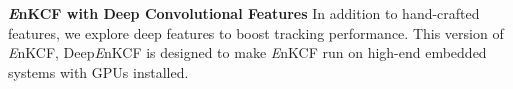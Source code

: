 \documentclass[10pt,twocolumn,letterpaper]{article}
\begin{document}
\textbf{{\it E}nKCF with Deep Convolutional Features} In addition to
hand-crafted features, we explore deep features to boost tracking
performance. This version of {\it E}nKCF, Deep{\it E}nKCF is designed
to make {\it E}nKCF run on high-end embedded systems with GPUs
installed.

\end{document}
